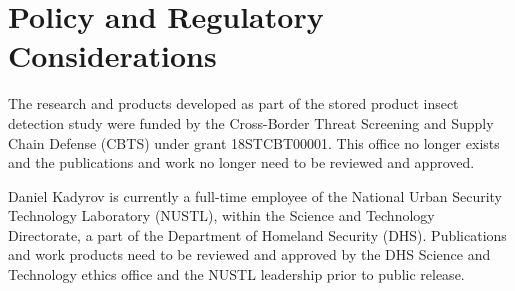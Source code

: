 \chapter{Policy and Regulatory Considerations}

The research and products developed as part of the stored product insect detection study were funded by the Cross-Border Threat Screening and Supply Chain Defense (CBTS) under grant 18STCBT00001. This office no longer exists and the publications and work no longer need to be reviewed and approved.

Daniel Kadyrov is currently a full-time employee of the National Urban Security Technology Laboratory (NUSTL), within the Science and Technology Directorate, a part of the Department of Homeland Security (DHS). Publications and work products need to be reviewed and approved by the DHS Science and Technology ethics office and the NUSTL leadership prior to public release.
\newpage

